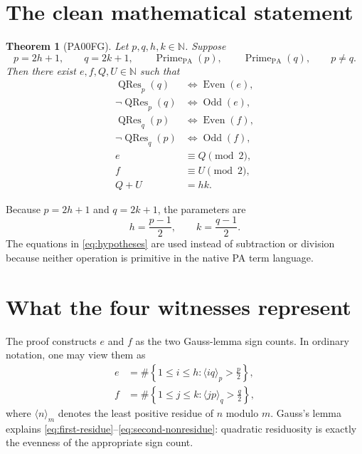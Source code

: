 \documentclass[11pt]{article}
\newtheorem{theorem}{Theorem}
\newcommand{\N}{\mathbb{N}}
\newcommand{\PrimePA}{\operatorname{Prime}_{\mathrm{PA}}}
\newcommand{\QRes}{\operatorname{QRes}}
\newcommand{\Even}{\operatorname{Even}}
\newcommand{\Odd}{\operatorname{Odd}}
\begin{document}
\section{The clean mathematical statement}

\begin{theorem}[PA00FG]
Let \(p,q,h,k\in\N\).  Suppose
\begin{equation}
  p=2h+1,
  \qquad
  q=2k+1,
  \qquad
  \PrimePA(p),
  \qquad
  \PrimePA(q),
  \qquad
  p\neq q.
  \label{eq:hypotheses}
\end{equation}
Then there exist \(e,f,Q,U\in\N\) such that
\begin{align}
  \QRes_p(q)
    &\Longleftrightarrow \Even(e),
    \label{eq:first-residue}\\
  \neg\QRes_p(q)
    &\Longleftrightarrow \Odd(e),
    \label{eq:first-nonresidue}\\
  \QRes_q(p)
    &\Longleftrightarrow \Even(f),
    \label{eq:second-residue}\\
  \neg\QRes_q(p)
    &\Longleftrightarrow \Odd(f),
    \label{eq:second-nonresidue}\\
  e&\equiv Q\pmod 2,
    \label{eq:first-parity}\\
  f&\equiv U\pmod 2,
    \label{eq:second-parity}\\
  Q+U&=hk.
    \label{eq:eisenstein}
\end{align}
\end{theorem}

Because \(p=2h+1\) and \(q=2k+1\), the parameters are
\begin{equation}
  h=\frac{p-1}{2},
  \qquad
  k=\frac{q-1}{2}.
  \label{eq:halves}
\end{equation}
The equations in \eqref{eq:hypotheses} are used instead of subtraction or
division because neither operation is primitive in the native PA term
language.

\section{What the four witnesses represent}

The proof constructs \(e\) and \(f\) as the two Gauss-lemma sign counts.  In
ordinary notation, one may view them as
\begin{align}
  e
  &=\#\left\{
      1\leq i\leq h:
      \langle iq\rangle_p>\frac{p}{2}
    \right\},
  \label{eq:e-count}\\
  f
  &=\#\left\{
      1\leq j\leq k:
      \langle jp\rangle_q>\frac{q}{2}
    \right\},
  \label{eq:f-count}
\end{align}
where \(\langle n\rangle_m\) denotes the least positive residue of \(n\)
modulo \(m\).  Gauss's lemma explains
\eqref{eq:first-residue}--\eqref{eq:second-nonresidue}: quadratic residuosity
is exactly the evenness of the appropriate sign count.
\end{document}
